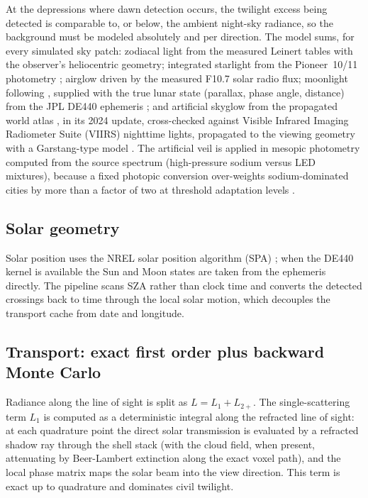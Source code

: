 \documentclass[preprint,12pt]{elsarticle}
\begin{document}
At the depressions where dawn detection occurs, the twilight excess being
detected is comparable to, or below, the ambient night-sky radiance, so
the background must be modeled absolutely and per direction. The model
sums, for every simulated sky patch: zodiacal light from the measured
Leinert tables \citep{leinert1998} with the observer's heliocentric
geometry; integrated starlight from the Pioneer~10/11 photometry
\citep{toller1981}; airglow driven by the measured F10.7 solar radio flux;
moonlight following \citet{krisciunas1991}, supplied with the true lunar state
(parallax, phase angle, distance) from the JPL DE440 ephemeris
\citep{park2021}; and artificial skyglow from the propagated world atlas
\citep{falchi2016}, in its 2024 update, cross-checked against Visible
Infrared Imaging Radiometer Suite (VIIRS) nighttime lights, propagated
to the viewing geometry with a Garstang-type
model \citep{garstang1989}. The artificial veil is applied in mesopic
photometry computed from the source spectrum (high-pressure sodium versus
LED mixtures), because a fixed photopic conversion over-weights
sodium-dominated cities by more than a factor of two at threshold
adaptation levels \citep{cie191}.

\subsection{Solar geometry}

Solar position uses the NREL solar position algorithm (SPA)
\citep{reda2004}; when the DE440
kernel is available the Sun and Moon states are taken from the ephemeris
directly. The pipeline scans SZA rather than clock time and
converts the detected crossings back to time through the local solar
motion, which decouples the transport cache from date and longitude.

\subsection{Transport: exact first order plus backward Monte Carlo}
\label{sec:transport}

Radiance along the line of sight is split as $L = L_1 + L_{2+}$. The
single-scattering term $L_1$ is computed as a deterministic integral along
the refracted line of sight: at each quadrature point the direct solar
transmission is evaluated by a refracted shadow ray through the shell
stack (with the cloud field, when present, attenuating by Beer-Lambert
extinction along the exact voxel path), and the local phase matrix maps
the solar beam into the view direction. This term is exact up to
quadrature and dominates civil twilight.
\end{document}
